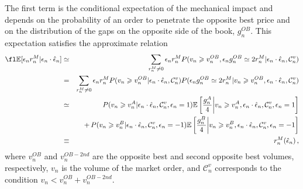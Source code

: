\documentclass[12pt]{iopart}
\begin{document}
The first term is the conditional expectation of the mechanical impact and depends on the probability of an order to penetrate the opposite best price and on the distribution of the gaps on the opposite side of the book, $g_n^{OB}$. This expectation satisfies the approximate relation 
\begin{eqnarray}
\fl  \mathbb{E}[\epsilon_n r_n^M|\epsilon_n\cdot\hat{\epsilon}_n]&\simeq&\sum_{r_n^M \neq 0}\epsilon_n r_n^M P(v_n \geqslant v_n^{OB},\epsilon_n g_n^{OB} \simeq 2r_n^M|\epsilon_n\cdot\hat{\epsilon}_n,\mathcal{C}_n^v) \nonumber \\
  &=&\sum_{r_n^M \neq 0}\epsilon_n r_n^M P(v_n \geqslant v_n^{OB}|\epsilon_n\cdot\hat{\epsilon}_n,\mathcal{C}_n^v)P(\epsilon_n g_n^{OB} \simeq 2r_n^M|v_n \geqslant v_n^{OB},\epsilon_n\cdot\hat{\epsilon}_n,\mathcal{C}_n^v) \nonumber \\
  &\simeq&P(v_n \geqslant v_n^A|\epsilon_n\cdot\hat{\epsilon}_n,\mathcal{C}_n^v,\epsilon_n=1)\mathbb{E}\left[\frac{g_n^A}{4}\bigg|v_n \geqslant v_n^A,\epsilon_n\cdot\hat{\epsilon}_n,\mathcal{C}_n^v,\epsilon_n=1\right] \nonumber \\
  &&+\,P(v_n \geqslant v_n^B|\epsilon_n\cdot\hat{\epsilon}_n,\mathcal{C}_n^v,\epsilon_n=-1)\mathbb{E}\left[\frac{g_n^B}{4}\bigg|v_n \geqslant v_n^B,\epsilon_n\cdot\hat{\epsilon}_n,\mathcal{C}_n^v,\epsilon_n=-1\right] \nonumber \\
  &\equiv& r_n^M(\hat{\epsilon}_n)\,,\label{eqn:mec_impact}
\end{eqnarray}
where $v_n^{OB}$ and $v_n^{OB-2nd}$ are the opposite best and second opposite best volumes, respectively,  $v_n$ is the volume of the market order, and  $\mathcal{C}_n^v$ corresponds to the condition $v_n<v_n^{OB}+v_n^{OB-2nd}$.
\end{document}
